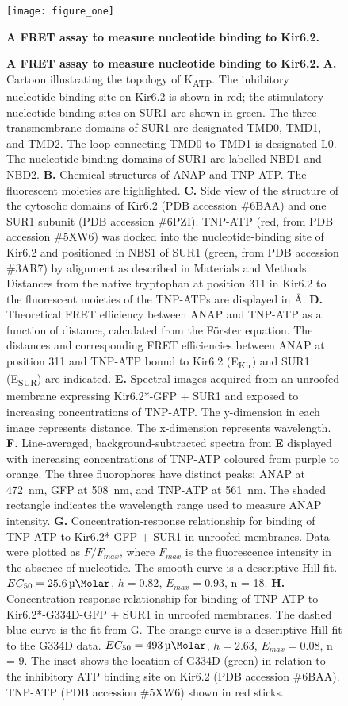 \documentclass[9pt,lineno, onehalfspacing]{elife_modified}
\begin{document}
\begin{figure}
\begin{fullwidth}
\texttt{[image: figure\_one]}
\caption{\textbf{A FRET assay to measure nucleotide binding to Kir6.2.}}
\label{fig:one}
\end{fullwidth}
\end{figure}
\begin{figure}\ContinuedFloat
\begin{fullwidth}
\caption{
\textbf{A FRET assay to measure nucleotide binding to Kir6.2.}
\textbf{A.}
Cartoon illustrating the topology of K\textsubscript{ATP}.
The inhibitory nucleotide-binding site on Kir6.2 is shown in red; the stimulatory nucleotide-binding sites on SUR1 are shown in green.
The three transmembrane domains of SUR1 are designated TMD0, TMD1, and TMD2.
The loop connecting TMD0 to TMD1 is designated L0.
The nucleotide binding domains of SUR1 are labelled NBD1 and NBD2.
\textbf{B.}
Chemical structures of ANAP and TNP-ATP. The fluorescent moieties are highlighted.
\textbf{C.}
Side view of the structure of the cytosolic domains of Kir6.2 (PDB accession \#6BAA) and one SUR1 subunit (PDB accession \#6PZI).
TNP-ATP (red, from PDB accession \#5XW6) was docked into the nucleotide-binding site of Kir6.2 and positioned in NBS1 of SUR1 (green, from PDB accession \#3AR7) by alignment as described in Materials and Methods.
Distances from the native tryptophan at position 311 in Kir6.2 to the fluorescent moieties of the TNP-ATPs are displayed in \si{\angstrom}.
\textbf{D.}
Theoretical FRET efficiency between ANAP and TNP-ATP as a function of distance, calculated from the Förster equation.
The distances and corresponding FRET efficiencies between ANAP at position 311 and TNP-ATP bound to Kir6.2 (E\textsubscript{Kir}) and SUR1 (E\textsubscript{SUR}) are indicated.
\textbf{E.}
Spectral images acquired from an unroofed membrane expressing Kir6.2*-GFP + SUR1 and exposed to increasing concentrations of TNP-ATP.
The y-dimension in each image represents distance.
The x-dimension represents wavelength.
\textbf{F.}
Line-averaged, background-subtracted spectra from \textbf{E} displayed with increasing concentrations of TNP-ATP coloured from purple to orange.
The three fluorophores have distinct peaks: ANAP at \SI{472}{\nano\metre}, GFP at \SI{508}{\nano\metre}, and TNP-ATP at \SI{561}{\nano\metre}.
The shaded rectangle indicates the wavelength range used to measure ANAP intensity.
\textbf{G.}
Concentration-response relationship for binding of TNP-ATP to Kir6.2*-GFP + SUR1 in unroofed membranes.
Data were plotted as $F/F_{max}$, where $F_{max}$ is the fluorescence intensity in the absence of nucleotide.
The smooth curve is a descriptive Hill fit.
$EC_{50} = \SI{25.6}{\micro\Molar}$, $h = 0.82$, $E_{max} = 0.93$, n = 18.
\textbf{H.}
Concentration-response relationship for binding of TNP-ATP to Kir6.2*-G334D-GFP + SUR1 in unroofed membranes.
The dashed blue curve is the fit from G. The orange curve is a descriptive Hill fit to the G334D data.
$EC_{50} = \SI{493}{\micro\Molar}$, $h = 2.63$, $E_{max} = 0.08$, n = 9.
The inset shows the location of G334D (green) in relation to the inhibitory ATP binding site on Kir6.2 (PDB accession \#6BAA).
TNP-ATP (PDB accession \#5XW6) shown in red sticks.
}


\end{fullwidth}
\end{figure}
\end{document}
